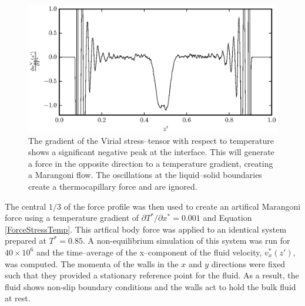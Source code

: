 \begin{figure}[h]
\centering
\includegraphics[scale=0.8]{PisVirForce}
\caption{The gradient of the Virial stress--tensor with respect to temperature shows a significant negative peak at the interface.
This will generate a force in the opposite direction to a temperature gradient, creating a Marangoni flow.
The oscillations at the liquid--solid boundaries create a thermocapillary force and are ignored.}
\label{PisVirForce}
\end{figure}
\FloatBarrier

The central $1/3$ of the force profile was then used to create an artifical Marangoni force using a temperature gradient of $\partial T^{*} / \partial x^{*} = 0.001$ and Equation \ref{ForceStressTemp}.
This artfical body force was applied to an identical system prepared at $T^{*} = 0.85$.
A non-equilibrium simulation of this system was run for $40 \times 10^{6}$ and the time--average of the x--component of the fluid velocity, $v^{*}_{x}(z')$, was computed.
The momenta of the walls in the $x$ and $y$ directions were fixed such that they provided a stationary reference point for the fluid.
As a result, the fluid shows non-slip boundary conditions and the walls act to hold the bulk fluid at rest.


